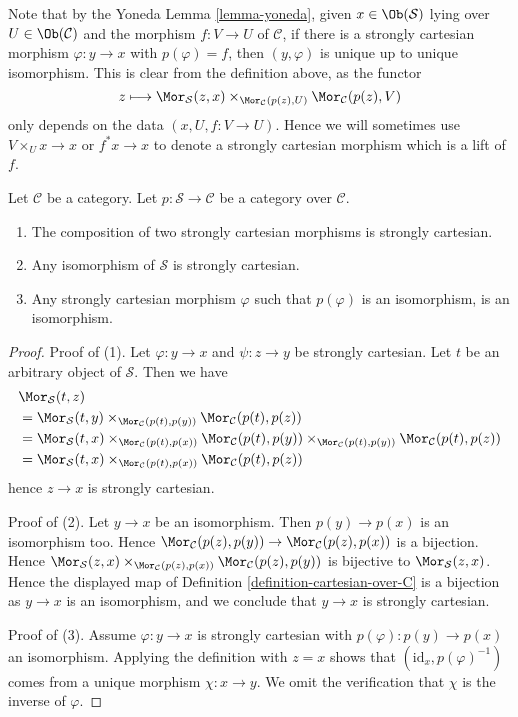 \noindent
Note that by the Yoneda Lemma \ref{lemma-yoneda}, given
$x \in \Ob(\mathcal{S})$ lying over $U \in \Ob(\mathcal{C})$
and the morphism $f : V \to U$ of $\mathcal{C}$, if there is a
strongly cartesian morphism $\varphi : y \to x$ with $p(\varphi) = f$,
then $(y, \varphi)$ is unique up to unique isomorphism. This is
clear from the definition above, as the functor
$$
z
\longmapsto
\Mor_\mathcal{S}(z, x)
\times_{\Mor_\mathcal{C}(p(z), U)}
\Mor_\mathcal{C}(p(z), V)
$$
only depends on the data $(x, U, f : V \to U)$. Hence we
will sometimes use $V \times_U x \to x$ or $f^*x \to x$
to denote a strongly cartesian morphism which is a lift of $f$.

\begin{lemma}
\label{lemma-composition-cartesian}
Let $\mathcal{C}$ be a category.
Let $p : \mathcal{S} \to \mathcal{C}$ be a category over $\mathcal{C}$.
\begin{enumerate}
\item The composition of two strongly cartesian morphisms
is strongly cartesian.
\item Any isomorphism of $\mathcal{S}$ is strongly cartesian.
\item Any strongly cartesian morphism $\varphi$ such that $p(\varphi)$
is an isomorphism, is an isomorphism.
\end{enumerate}
\end{lemma}

\begin{proof}
Proof of (1). Let $\varphi : y \to x$ and $\psi : z \to y$ be
strongly cartesian. Let $t$ be an arbitrary object of $\mathcal{S}$.
Then we have
\begin{align*}
& \Mor_\mathcal{S}(t, z) \\
& =
\Mor_\mathcal{S}(t, y)
\times_{\Mor_\mathcal{C}(p(t), p(y))}
\Mor_\mathcal{C}(p(t), p(z)) \\
& =
\Mor_\mathcal{S}(t, x)
\times_{\Mor_\mathcal{C}(p(t), p(x))}
\Mor_\mathcal{C}(p(t), p(y))
\times_{\Mor_\mathcal{C}(p(t), p(y))}
\Mor_\mathcal{C}(p(t), p(z)) \\
& =
\Mor_\mathcal{S}(t, x)
\times_{\Mor_\mathcal{C}(p(t), p(x))}
\Mor_\mathcal{C}(p(t), p(z))
\end{align*}
hence $z \to x$ is strongly cartesian.

\medskip\noindent
Proof of (2). Let $y \to x$ be an isomorphism. Then $p(y) \to p(x)$
is an isomorphism too. Hence
$\Mor_\mathcal{C}(p(z), p(y)) \to
\Mor_\mathcal{C}(p(z), p(x))$
is a bijection. Hence
$\Mor_\mathcal{S}(z, x)
\times_{\Mor_\mathcal{C}(p(z), p(x))}
\Mor_\mathcal{C}(p(z), p(y))$ is bijective to
$\Mor_\mathcal{S}(z, x)$.
Hence the displayed map of
Definition \ref{definition-cartesian-over-C}
is a bijection as $y \to x$ is an isomorphism, and we conclude that
$y \to x$ is strongly cartesian.

\medskip\noindent
Proof of (3). Assume $\varphi : y \to x$ is strongly cartesian with
$p(\varphi) : p(y) \to p(x)$ an isomorphism. Applying the definition with
$z = x$ shows that $(\text{id}_x, p(\varphi)^{-1})$ comes from a unique
morphism $\chi : x \to y$. We omit the verification that $\chi$ is the
inverse of $\varphi$.
\end{proof}

